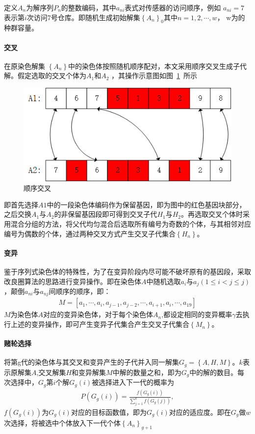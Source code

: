 \documentclass{whutmod}
\begin{document}
		定义$A_n$为解序列$P_{n}$的整数编码，其中$a_{ni}$表式对传感器的访问顺序，例如 $a_{ni}=7$表示第$i$次访问7号仓库。即随机生成初始解集$\left \{A_n\right \}_0$其中$n=1,2,\cdots,w$， w为的种群容量。
		
		\paragraph{交叉}
		在原染色解集 $\left \{ A_n \right \}$中的染色体按照随机顺序配对，本文采用顺序交叉生成子代解。假定选取的交叉个体为$A_1$和$A_2$    ，其操作示意图如图~\ref{gbf}~所示
		\begin{figure}[H]
			\centering
			\includegraphics[width=\textwidth]{figures/cross.png}
			\caption{顺序交叉}\label{gbf}
		\end{figure}
		
		即首先选择$A1$中的一段染色体编码作为保留基因，即为图中的红色基因块部分，之后交换$A_1$与$A_2$的非保留基因段即可得到交叉子代$H_1$与$H_2$。再选取交叉个体时采用混合分组的方法，将父代均匀混合后选取所有编号为奇数的个体，与其相邻对应编号为偶数的个体，通过两种交叉方式产生交叉子代集合$\left \{ H_n \right \}$。
	     
		
		
		\paragraph{变异}
		鉴于序列式染色体的特殊性，为了在变异阶段内尽可能不破坏原有的基因段，采取改良圈算法的思路进行变异操作。即在染色体$A$中随机选取$a_{i}$与$a_{j}(1\leqslant i<j\leqslant j )$，颠倒$a_{ni}$与$a_{nj}$间顺序的顺序，即：
		\begin{gather}
		M=[a_{1},\cdots,a_{i},a_{j-1},a_{j-2},\cdots,a_{i+1},a_{i},\cdots,a_{19}]
		\end{gather}
		$M$为染色体$A$对应的变异染色体，对于每个染色体$A_n$,都设定相同的变异概率$\gamma$去执行上述的变异操作，即可产生变异子代集合产生交叉子代集合$\left \{ M_n \right \}$。 
		\paragraph{赌轮选择}
		将第g代的染色体与其交叉和变异产生的子代并入同一解集$G_g=\left \{A,H,M\right \}$。$k$表示原解集$A$,交叉解集$H$和变异解集$M$中解的数量之和，即为$G_g$中的解的数目。每次选择中，$G_g$第$i$个解$G_g(i)$被选择进入下一代的概率为
		\begin{gather}
		P(G_{g}(i))=\frac{f(G_{g}(i))}{\sum_{j=1}^{k}f(G_{g}(j))},
		\end{gather}
		$f(G_{g}(i))$为$G_{g}(i)$对应的目标函数值，即为$G_{g}(i)$对应的适应度。即在$G_g$做$w$次选择，将被选中个体放入下一代个体$\left \{A_n  \right \}_{g+1}$
\end{document}
